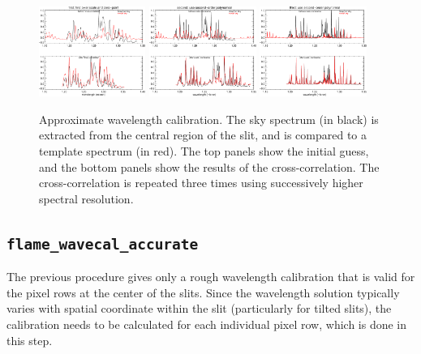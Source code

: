 \documentclass[a4paper, notitlepage]{article}
\begin{document}
\begin{figure}[tbp]
\begin{minipage}{\textwidth}
   \centering
 \includegraphics[width=0.31\textwidth]{wavecal1}
   \hspace*{0.01\textwidth}
 \includegraphics[width=0.31\textwidth]{wavecal2}
  \hspace*{0.01\textwidth}
 \includegraphics[width=0.31\textwidth]{wavecal3}
\end{minipage}
\caption{Approximate wavelength calibration. The sky spectrum (in black) is extracted from the central region of the slit, and is compared to a template spectrum (in red). The top panels show the initial guess, and the bottom panels show the results of the cross-correlation. The cross-correlation is repeated three times using successively higher spectral resolution.}
\label{fig:wavecal_approx}
\end{figure}


\subsection{\texttt{flame\_wavecal\_accurate}}

The previous procedure gives only a rough wavelength calibration that is valid for the pixel rows at the center of the slits. Since the wavelength solution typically varies with spatial coordinate within the slit (particularly for tilted slits), the calibration needs to be calculated for each individual pixel row, which is done in this step.
\end{document}
